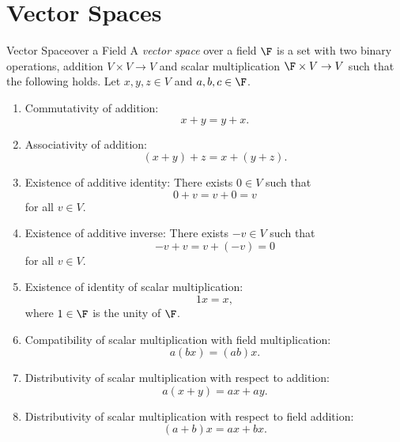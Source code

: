 \documentclass[linearalgebra]{subfiles}
\begin{document}

    \section{Vector Spaces}

    \begin{definition}{Vector Space}{over a Field}
        A \emph{vector space} over a field $\F$ is a set with two binary operations, addition $V\times V\to V$ and scalar multiplication $\F\times V\to V$ such that the following holds. Let $x,y,z\in V$ and $a,b,c\in\F$.
        \begin{enumerate}
            \item Commutativity of addition: 
                \begin{equation*}
                    x+y=y+x.
                \end{equation*}
            \item Associativity of addition: 
                \begin{equation*}
                    (x+y)+z=x+(y+z).
                \end{equation*}
            \item Existence of additive identity: There exists $0\in V$ such that 
                \begin{equation*}
                    0+v=v+0=v 
                \end{equation*}
                for all $v\in V$.
            \item Existence of additive inverse: There exists $-v\in V$ such that 
                \begin{equation*}
                    -v+v=v+(-v)=0 
                \end{equation*}
                for all $v\in V$.
            \item Existence of identity of scalar multiplication: 
                \begin{equation*}
                    1x=x, 
                \end{equation*}
                where $1\in\F$ is the unity of $\F$.
            \item Compatibility of scalar multiplication with field multiplication: 
                \begin{equation*}
                    a(bx)=(ab)x.
                \end{equation*}
            \item Distributivity of scalar multiplication with respect to addition: 
                \begin{equation*}
                    a(x+y)=ax+ay.
                \end{equation*}
            \item Distributivity of scalar multiplication with respect to field addition: 
                \begin{equation*}
                    (a+b)x=ax+bx.
                \end{equation*}
        \end{enumerate}
    \end{definition}
\end{document}
